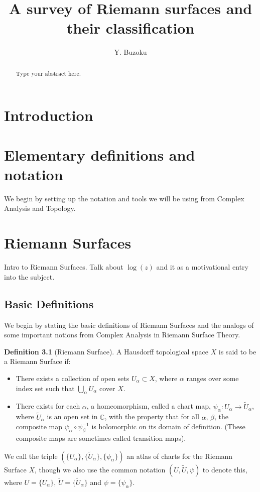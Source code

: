 \documentclass[11pt]{report}
\title{A survey of Riemann surfaces and their classification}
\author{Y. Buzoku}
\theoremstyle{definition}
\newtheorem{defn}[thm]{Definition}
\begin{document}
\maketitle
\tableofcontents

\newpage
\begin{abstract}
Type your abstract here.
\end{abstract}
\declaration %
\chapter{Introduction}


\chapter{Elementary definitions and notation}
We begin by setting up the notation and tools we will be using from Complex Analysis and Topology.

\chapter{Riemann Surfaces}

Intro to Riemann Surfaces. Talk about $\log(z)$ and it as a motivational entry into the subject.


\section{Basic Definitions}\label{bdefns}

We begin by stating the basic definitions of Riemann Surfaces and the 
analogs of some important notions from Complex Analysis in Riemann Surface
Theory.

\begin{defn}[Riemann Surface]\label{rsdefn}
A Hausdorff topological space $X$ is said to be a Riemann Surface if:
\begin{itemize}
\item There exists a collection of open sets $U_{\alpha} \subset X$, where
  $
\alpha$ 
ranges over some index set such that $\bigcup\limits_{\alpha} U_{\alpha}$
cover 
$X$.
\item There exists for each $\alpha$, a homeomorphism, called a chart map,
  $ \psi_{\alpha}\colon U_{\alpha} \rightarrow \tilde{U}_{\alpha}$, where
$\tilde{U}_{\alpha}$ is 
  an open set in $\mathbb{C}$, with the property that for all $\alpha$,
  $\beta$, the composite map $\psi_{\alpha} \circ \psi_{\beta}^{-1}$ is
  holomorphic on its 
domain of 
definition. (These composite maps are sometimes called transition maps).
\end{itemize}
We call the triple $(\{U_\alpha\},\{\tilde{U}_{\alpha}\},
\{\psi_\alpha\})$ an 
atlas of 
charts for the Riemann Surface $X$, though we also use the common
notation $(U,
\tilde{U}, \psi)$ to denote this, where $U=\{U_\alpha\}$,
$\tilde{U}=\{\tilde{U}
_{\alpha}\}$ and $\psi=\{\psi_\alpha\}$.
\end{defn}
\end{document}

